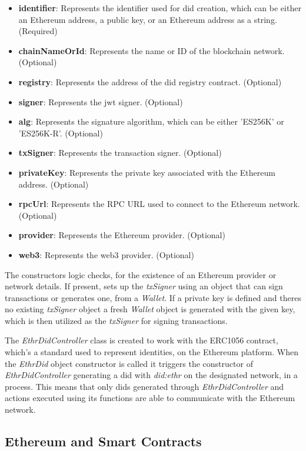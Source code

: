 \begin{itemize}
  \item \textbf{identifier}: Represents the identifier used for \gls{did} creation, which can be either an Ethereum address, a public key, or an Ethereum address as a string. (Required)
  \item \textbf{chainNameOrId}: Represents the name or ID of the blockchain network. (Optional)
  \item \textbf{registry}: Represents the address of the \gls{did} registry contract. (Optional)
  \item \textbf{signer}: Represents the \gls{jwt} signer. (Optional)
  \item \textbf{alg}: Represents the signature algorithm, which can be either 'ES256K' or 'ES256K-R'. (Optional)
  \item \textbf{txSigner}: Represents the transaction signer. (Optional)
  \item \textbf{privateKey}: Represents the private key associated with the Ethereum address. (Optional)
  \item \textbf{rpcUrl}: Represents the RPC URL used to connect to the Ethereum network. (Optional)
  \item \textbf{provider}: Represents the Ethereum provider. (Optional)
  \item \textbf{web3}: Represents the web3 provider. (Optional)
\end{itemize}

The constructors logic checks, for the existence of an Ethereum provider or network details. If present, sets up the \textit{txSigner} using an object that can sign transactions or 
generates one, from a \textit{Wallet}. If a private key is defined and theres no existing \textit{txSigner} object a fresh \textit{Wallet} object is generated with the given key, which is then 
utilized as the \textit{txSigner} for signing transactions.

The \textit{EthrDidController} class is created to work with the ERC1056 contract, which's a standard used to represent identities, on the Ethereum platform. When the \textit{EthrDid} 
object constructor is called it triggers the constructor of \textit{EthrDidController} generating a \gls{did} with \textit{did:ethr} on the designated network, in a process. This means that only 
\gls{did}s generated through \textit{EthrDidController} and actions executed using its functions are able to communicate with the Ethereum network.

\subsection{Ethereum and Smart Contracts}

